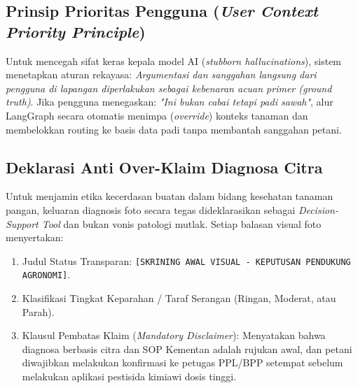 \documentclass[11pt,a4paper]{article}
\begin{document}
\subsection{Prinsip Prioritas Pengguna (\textit{User Context Priority Principle})}
Untuk mencegah sifat keras kepala model AI (\textit{stubborn hallucinations}), sistem menetapkan aturan rekayasa: \textit{Argumentasi dan sanggahan langsung dari pengguna di lapangan diperlakukan sebagai kebenaran acuan primer (ground truth)}. Jika pengguna menegaskan: \textit{"Ini bukan cabai tetapi padi sawah"}, alur LangGraph secara otomatis menimpa (\textit{override}) konteks tanaman dan membelokkan routing ke basis data padi tanpa membantah sanggahan petani.

\subsection{Deklarasi Anti Over-Klaim Diagnosa Citra}
Untuk menjamin etika kecerdasan buatan dalam bidang kesehatan tanaman pangan, keluaran diagnosis foto secara tegas dideklarasikan sebagai \textit{Decision-Support Tool} dan bukan vonis patologi mutlak. Setiap balasan visual foto menyertakan:
\begin{enumerate}
    \item Judul Status Transparan: \texttt{[SKRINING AWAL VISUAL - KEPUTUSAN PENDUKUNG AGRONOMI]}.
    \item Klasifikasi Tingkat Keparahan / Taraf Serangan (Ringan, Moderat, atau Parah).
    \item Klausul Pembatas Klaim (\textit{Mandatory Disclaimer}): Menyatakan bahwa diagnosa berbasis citra dan SOP Kementan adalah rujukan awal, dan petani diwajibkan melakukan konfirmasi ke petugas PPL/BPP setempat sebelum melakukan aplikasi pestisida kimiawi dosis tinggi.
\end{enumerate}
\end{document}
